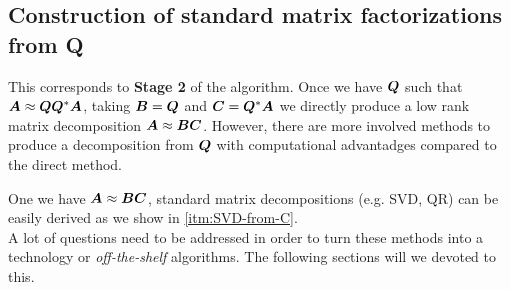 \subsection{Construction of standard matrix factorizations from Q}

This corresponds to \textbf{Stage 2} of the algorithm. Once we have $\bm{Q}$
such that $\bm{A}\approx\bm{Q}\bm{Q}^*\bm{A}$, taking 
$\bm{B}=\bm{Q}$ and $\bm{C}=\bm{Q}^*\bm{A}$ we directly produce a low rank
matrix decomposition $\bm{A}\approx\bm{B}\bm{C}$. However, 
there are more involved methods to produce a decomposition from $\bm{Q}$ with
computational advantadges compared to the direct method. 

One we have $\bm{A}\approx\bm{B}\bm{C}$, standard matrix decompositions 
(e.g. SVD, QR) can be easily derived as we show in \ref{itm:SVD-from-C}. \\



A lot of questions need to be addressed in order to turn these methods into
a technology or \textit{off-the-shelf} algorithms. The following 
sections will we devoted to this.
